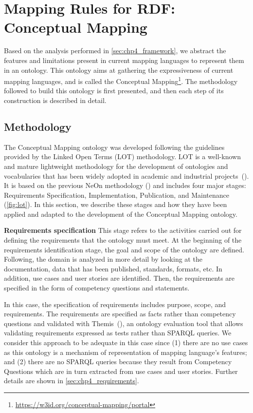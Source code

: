 \section{Mapping Rules for RDF: Conceptual Mapping}
\label{sec:chp4_cm_ontology}

Based on the analysis performed in \cref{sec:chp4_framework}, we abstract the features and limitations present in current mapping languages to represent them in an ontology. This ontology aims at gathering the expressiveness of current mapping languages, and is called the Conceptual Mapping\footnote{\label{foot:cmportal}\url{https://w3id.org/conceptual-mapping/portal}}. The methodology followed to build this ontology is first presented, and then each step of its construction is described in detail.

\subsection{Methodology}
The Conceptual Mapping ontology was developed following the guidelines provided by the Linked Open Terms (LOT) methodology. LOT is a well-known and mature lightweight methodology for the development of ontologies and vocabularies that has been widely adopted in academic and industrial projects~(\cite{poveda2022lot}). It is based on the previous NeOn methodology (\cite{suarez2015neon}) and includes four major stages: Requirements Specification, Implementation, Publication, and Maintenance (\cref{fig:lot}). In this section, we describe these stages and how they have been applied and adapted to the development of the Conceptual Mapping ontology.

\noindent\textbf{Requirements specification}
This stage refers to the activities carried out for defining the requirements that the ontology must meet. At the beginning of the requirements identification stage, the goal and scope of the ontology are defined. Following, the domain is analyzed in more detail by looking at the documentation, data that has been published, standards, formats, etc. In addition, use cases and user stories are identified. Then, the requirements are specified in the form of competency questions and statements. 

In this case, the specification of requirements includes purpose, scope, and requirements. The requirements are specified as facts rather than competency questions and validated with Themis~(\cite{fernandez2021themis}), an ontology evaluation tool that allows validating requirements expressed as tests rather than SPARQL queries. We consider this approach to be adequate in this case since (1) there are no use cases as this ontology is a mechanism of representation of  mapping language's features; and (2) there are no SPARQL queries because they result from Competency Questions which are in turn extracted from use cases and user stories. Further details are shown in \cref{sec:chp4_requirements}.

